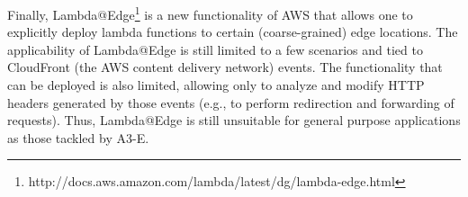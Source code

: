 Finally, Lambda@Edge\footnote{http://docs.aws.amazon.com/lambda/latest/dg/lambda-edge.html} is a new functionality of AWS that allows one to explicitly deploy lambda functions to certain (coarse-grained) edge locations. The applicability of Lambda@Edge is still limited to a few scenarios and tied to CloudFront (the AWS content delivery network) events. The functionality that can be deployed is also limited, allowing only to analyze and modify HTTP headers generated by those events (e.g., to perform redirection and forwarding of requests). Thus, Lambda@Edge is still unsuitable for general purpose applications as those tackled by A3-E. 



%










